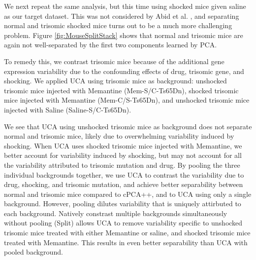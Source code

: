 \documentclass[12pt]{article}
\begin{document}
We next repeat the same analysis, but this time using shocked mice given saline as our target dataset. This was not considered by Abid et al. \cite{Abid}, and separating normal and trisomic shocked mice turns out to be a much more challenging problem. Figure \ref{fig:MouseSplitStack} shows that normal and trisomic mice are again not well-separated by the first two components learned by PCA.

To remedy this, we contrast trisomic mice because of the additional gene expression variability due to the confounding effects of drug, trisomic gene, and shocking. We applied UCA using trisomic mice as background: unshocked trisomic mice injected with Memantine (Mem-S/C-Ts65Dn), shocked trisomic mice injected with Memantine (Mem-C/S-Ts65Dn), and unshocked trisomic mice injected with Saline (Saline-S/C-Ts65Dn). 

 We see that UCA using unshocked trisomic mice as background does not separate normal and trisomic mice, likely due to overwhelming variability induced by shocking. When UCA uses shocked trisomic mice injected with Memantine, we better account for variability induced by shocking, but may not account for all the variability attributed to trisomic mutation and drug.
 By pooling the three individual backgrounds together, we use UCA to contrast the variability due to drug, shocking, and trisomic mutation, and achieve better separability between normal and trisomic mice compared to cPCA++, and to UCA using only a single background. However, pooling dilutes variability that is uniquely attirbuted to each background.
 Natively constrast multiple backgrounds simultaneously without pooling (Split) allows UCA to remove variability specific to unshocked trisomic mice treated with either Memantine or saline, and shocked trisomic mice treated with Memantine. This results in even better separability than UCA with pooled background.







\end{document}
